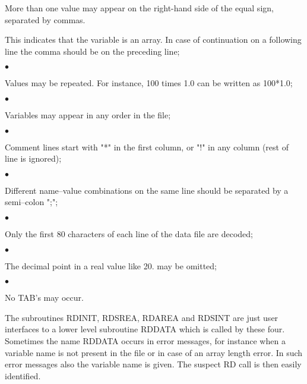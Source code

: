 \documentclass[11pt]{article}
\begin{document}
\begin{indenting}{1.27cm}
More than one value may appear on the right-hand side of the equal sign, separat\-ed by commas.
\end{indenting}

\zerotestlastline
\begin{indenting}{1.27cm}
This indicates that the variable is an array. In case of conti\-{\nobreak}nua\-tion on a following
line the comma should be on the preceding line;
\end{indenting}
$\bullet$
\testlastline

\begin{indenting}{1.27cm}
Values may be repeated. For instance, 100 times 1.0 can be written as 100*1.0;
\end{indenting}
$\bullet$
\testlastline

\begin{indenting}{1.27cm}
Variables may appear in any order in the file;
\end{indenting}
$\bullet$
\testlastline

\begin{indenting}{1.27cm}
Comment lines start with "*" in the first column, or "!" in any column (rest of
line is ignored);
\end{indenting}

 \bigskip
$\bullet$
\testlastline

\begin{indenting}{1.27cm}
Different name--{}value combinations on the same line should be separated by a
{\nobreak}semi--{}colon ";";
\end{indenting}
$\bullet$
\testlastline

\begin{indenting}{1.27cm}
Only the first 80 characters of each line of the data file are decoded;
\end{indenting}
$\bullet$
\testlastline

\begin{indenting}{1.27cm}
The decimal point in a real value like 20. may be omitted;
\end{indenting}
$\bullet$
\testlastline

\begin{indenting}{1.27cm}
No TAB's may occur.
\end{indenting}

 \bigskip
The subroutines RDINIT, RDSREA, RDAREA and RDSINT are just user interfaces to a
lower level subroutine RDDATA which is called by these four. Sometimes the name
RDDATA occurs in error messages, for instance when a variable name is not present in
the file or in case of an array length error. In such error messages also the variable name
is given. The suspect RD call is then easily identified.
\end{document}
